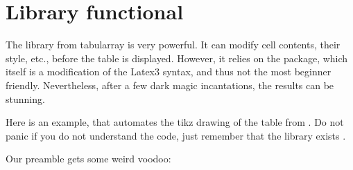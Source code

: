 \chapter{Library functional}\label{app:functional}

The  library from tabularray is very powerful. It can modify cell contents, their style, etc., before the table is displayed. However, it relies on the  package, which itself is a modification of the Latex3 syntax, and thus not the most beginner friendly. Nevertheless, after a few dark magic incantations, the results can be stunning. 

Here is an example, that automates the tikz drawing of the table from . Do not panic if you do not understand the code, just remember that the library exists . 

Our preamble gets some weird voodoo:


